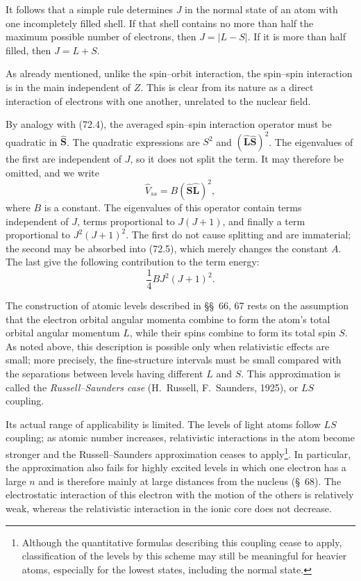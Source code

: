 It follows that a simple rule determines $J$ in the normal state of an atom with one incompletely filled shell. If that shell contains no more than half the maximum possible number of electrons, then $J=|L-S|$. If it is more than half filled, then $J=L+S$.

As already mentioned, unlike the spin--orbit interaction, the spin--spin interaction is in the main independent of $Z$. This is clear from its nature as a direct interaction of electrons with one another, unrelated to the nuclear field.

By analogy with (72.4), the averaged spin--spin interaction operator must be quadratic in $\hat{\mathbf S}$. The quadratic expressions are $S^2$ and $(\hat{\mathbf L}\hat{\mathbf S})^2$. The eigenvalues of the first are independent of $J$, so it does not split the term. It may therefore be omitted, and we write
\begin{equation}
 \hat V_{ss}=B(\hat{\mathbf S}\hat{\mathbf L})^2,
 \tag{72.7}
\end{equation}
where $B$ is a constant. The eigenvalues of this operator contain terms independent of $J$, terms proportional to $J(J+1)$, and finally a term proportional to $J^2(J+1)^2$. The first do not cause splitting and are immaterial; the second may be absorbed into (72.5), which merely changes the constant $A$. The last give the following contribution to the term energy:
\begin{equation}
 \frac14BJ^2(J+1)^2.
 \tag{72.8}
\end{equation}

The construction of atomic levels described in \S\S~66, 67 rests on the assumption that the electron orbital angular momenta combine to form the atom's total orbital angular momentum $L$, while their spins combine to form its total spin $S$. As noted above, this description is possible only when relativistic effects are small; more precisely, the fine-structure intervals must be small compared with the separations between levels having different $L$ and $S$. This approximation is called the \emph{Russell--Saunders case} (H.~Russell, F.~Saunders, 1925), or $LS$ coupling.

Its actual range of applicability is limited. The levels of light atoms follow $LS$ coupling; as atomic number increases, relativistic interactions in the atom become stronger and the Russell--Saunders approximation ceases to apply\footnote{Although the quantitative formulas describing this coupling cease to apply, classification of the levels by this scheme may still be meaningful for heavier atoms, especially for the lowest states, including the normal state.}. In particular, the approximation also fails for highly excited levels in which one electron has a large $n$ and is therefore mainly at large distances from the nucleus (\S~68). The electrostatic interaction of this electron with the motion of the others is relatively weak, whereas the relativistic interaction in the ionic core does not decrease.

